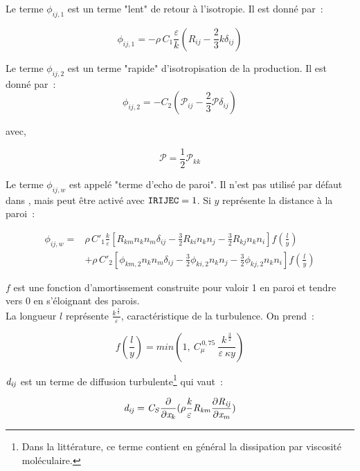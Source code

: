 Le terme $\phi_{ij,1}$ est un terme "lent" de retour à l'isotropie. Il est donné par~:

\begin{equation}
\displaystyle
\phi_{ij,1} = -\rho\,C_1 \frac{\varepsilon}{k} (R_{ij} - \frac{2}{3} k \delta_{ij})
\end{equation}

Le terme $\phi_{ij,2}$ est un terme "rapide" d'isotropisation de la production. Il est donné par~:
\begin{equation}
\displaystyle
\phi_{ij,2} = -C_2 (\mathcal{P}_{ij} - \frac{2}{3} \mathcal{P} \delta_{ij})
\end{equation}

avec,

$$\displaystyle \mathcal{P} = \frac{1}{2} \mathcal{P}_{kk}$$

Le terme $\phi_{ij,w}$ est appelé "terme d'echo de paroi". Il n'est pas
utilisé par défaut dans \CS, mais peut être activé avec $\text{\texttt{IRIJEC}} = 1$. Si $y$ représente la distance à la paroi~:

\begin{equation}
\begin{array} {ll}
\displaystyle
\phi_{ij,w}  = &
\displaystyle \rho\,C'_1 \frac{k}{\varepsilon} \left[ R_{km} n_k n_m \delta_{ij} -
\frac{3}{2} R_{ki} n_k n_j -
\frac{3}{2} R_{kj} n_k n_i \right] f(\frac{l}{y})  \\
&
+\displaystyle \rho\,C'_2 \left[ \phi_{km,2} n_k n_m \delta_{ij} -
\frac{3}{2} \phi_{ki,2} n_k n_j -
\frac{3}{2} \phi_{kj,2} n_k n_i \right] f(\frac{l}{y})
\end{array}
\end{equation}

$f$ est une fonction d'amortissement construite pour valoir 1 en paroi et tendre
vers 0 en s'éloignant des parois.\\
La longueur $l$ représente
$\displaystyle\frac{k^{\,\frac{3}{2}}}{\varepsilon}$, caractéristique de la turbulence. On prend~:

\begin{equation}
f(\frac{l}{y}) = min(1, \ C^{\,0,75}_{\mu} \
\frac{k^{\,\frac{3}{2}}}{\varepsilon\ \kappa y})
\end{equation}


$\it{d}_{ij}$ est un terme de diffusion turbulente\footnote{Dans la littérature, ce terme contient en général la dissipation par viscosité moléculaire.} qui vaut~:

\begin{equation}
\it{d}_{ij} = C_{S} \frac{\partial}{\partial x_k} (\rho \frac{k}{\varepsilon} R_{km} \frac{\partial R_{ij}}{\partial x_m})
\end{equation}

